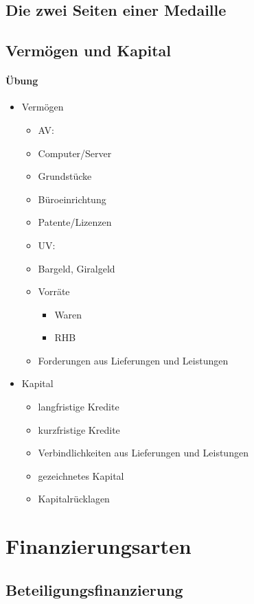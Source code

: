 \subsection{Die zwei Seiten einer Medaille}
\subsection{Vermögen und Kapital}
\paragraph{Übung}
\begin{itemize}
\item Vermögen
\begin{itemize}
\item[] AV:
\item Computer/Server
\item Grundstücke
\item Büroeinrichtung
\item Patente/Lizenzen
\item[] UV:
\item Bargeld, Giralgeld
\item Vorräte
\begin{itemize}
\item Waren
\item RHB
\end{itemize}
\item Forderungen aus Lieferungen und Leistungen
\end{itemize}
\item Kapital
\begin{itemize}
\item langfristige Kredite
\item kurzfristige Kredite
\item Verbindlichkeiten aus Lieferungen und Leistungen
\item gezeichnetes Kapital
\item Kapitalrücklagen
\end{itemize}
\end{itemize}
\section{Finanzierungsarten}
\subsection{Beteiligungsfinanzierung}
